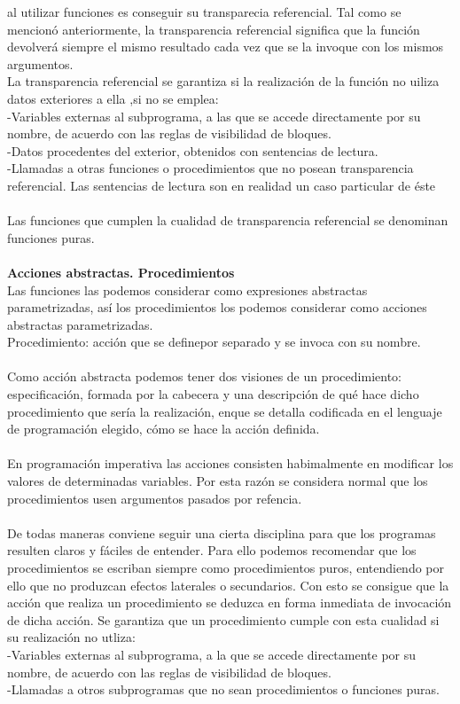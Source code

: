 \documentclass[11pt,a4paper]{article}
\begin{document}
  al utilizar funciones es conseguir su transparecia referencial. Tal como se
  mencionó anteriormente, la transparencia referencial significa que la función
  devolverá siempre el mismo resultado cada vez que se la invoque con los mismos argumentos.
  \\
  La transparencia referencial se garantiza si la realización de la función no uiliza datos exteriores a ella
  ,si no se emplea:
  \\
  -Variables externas al subprograma, a las que se accede directamente por
  su nombre, de acuerdo con las reglas de visibilidad de bloques.\\
  -Datos procedentes del exterior, obtenidos con sentencias de lectura.\\
  -Llamadas a otras funciones o procedimientos que no posean transparencia referencial. Las sentencias de lectura son en realidad un caso particular de éste\\
  \\
  Las funciones que cumplen la cualidad de transparencia referencial se denominan funciones puras.\\
  \\
  \textbf{Acciones abstractas. Procedimientos}\\
  Las funciones las podemos considerar como expresiones abstractas parametrizadas, así los procedimientos los podemos considerar como acciones abstractas parametrizadas.\\
  
  Procedimiento: acción que se definepor separado y se invoca con su nombre.\\
  \\
  Como acción abstracta podemos tener dos visiones de un procedimiento: especificación, formada por la cabecera y una descripción de qué hace dicho procedimiento que sería la realización, enque se detalla codificada en el lenguaje de programación elegido, cómo se hace la acción definida.\\
  \\
  En programación imperativa las acciones consisten habimalmente
  en modificar los valores de determinadas variables. Por esta razón se
  considera normal que los procedimientos usen argumentos pasados por refencia.
  \\
  \\
  De todas maneras conviene seguir una cierta disciplina para que los programas
  resulten claros y fáciles de entender. Para ello podemos recomendar que los
  procedimientos se escriban siempre como procedimientos puros, entendiendo
  por ello que no produzcan efectos laterales o secundarios. Con esto se consigue que
  la acción que realiza un procedimiento se deduzca en forma inmediata de
  invocación de dicha acción. Se garantiza que un procedimiento cumple con
  esta cualidad si su realización no utliza:\\
  -Variables externas al subprograma, a la que se accede directamente por
  su nombre, de acuerdo con las reglas de visibilidad de bloques. \\
  -Llamadas a otros subprogramas que no sean procedimientos o funciones
  puras. 
\end{document}
